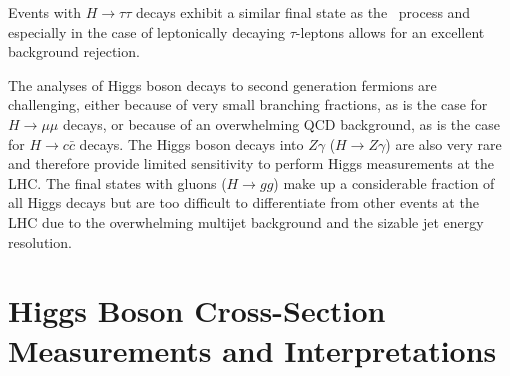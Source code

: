 
Events with $H \to \tau\tau $ decays exhibit a similar final state as the \HWW\ process and especially in the case of leptonically decaying $\tau$-leptons allows for an excellent background rejection. 

The analyses of Higgs boson decays to second generation fermions are challenging, either because of very small branching fractions, as is the case for $H \to \mu\mu$ decays, or because of an overwhelming QCD background, as is the case for $H \to c\bar{c}$ decays.
The Higgs boson decays into $Z\gamma$ ($H \to Z\gamma$) are also very rare and therefore provide limited sensitivity to perform Higgs measurements at the LHC. 
The final states with gluons ($H \to gg$) make up a considerable fraction of all Higgs decays but are too difficult to differentiate from other events at the LHC due to the overwhelming multijet background and the sizable jet energy resolution. 


\section{Higgs Boson Cross-Section Measurements and Interpretations}
\label{subsec:xsec-measurements}

